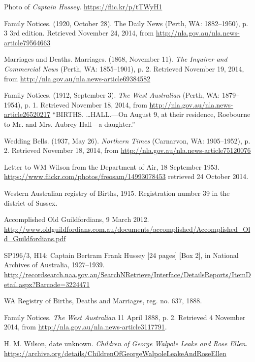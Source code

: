 \begin{thebibliography}{999}
	Photo of \emph{Captain Hussey}. \url{https://flic.kr/p/tTWyH1}

	Family Notices. (1920, October 28). The Daily News (Perth, WA: 1882--1950), p. 3 3rd edition.
	Retrieved November 24, 2014, from \url{http://nla.gov.au/nla.news-article79564663}

	Marriages and Deaths. Marriages. (1868, November 11). \emph{The Inquirer and Commercial News} (Perth, WA: 1855--1901), p. 2.
	Retrieved November 19, 2014, from \url{http://nla.gov.au/nla.news-article69384582}
    
	Family Notices. (1912, September 3). \emph{The West Australian} (Perth, WA: 1879--1954), p. 1.
	Retrieved November 18, 2014, from \url{http://nla.gov.au/nla.news-article26520217}
	``BIRTHS. \dots HALL.---On August 9, at their residence, Roebourne to Mr. and Mrs. Aubrey Hall---a daughter.''

	Wedding Bells. (1937, May 26). \emph{Northern Times} (Carnarvon, WA: 1905--1952), p. 2.
	Retrieved November 18, 2014, from \url{http://nla.gov.au/nla.news-article75120076}

	Letter to WM Wilson from the Department of Air, 18 September 1953.
	\url{https://www.flickr.com/photos/freosam/14993078453} retrieved 24 October 2014.

	Western Australian registry of Births, 1915. Registration number 39 in the district of Sussex.

	Accomplished Old Guildfordians, 9 March 2012.
	\url{http://www.oldguildfordians.com.au/documents/accomplished/Accomplished_Old_Guildfordians.pdf}

	SP196/3, H14: Captain Bertram Frank Hussey [24 pages] [Box 2], in National Archives of Australia, 1927--1939.
	\url{http://recordsearch.naa.gov.au/SearchNRetrieve/Interface/DetailsReports/ItemDetail.aspx?Barcode=3224471}

	WA Registry of Births, Deaths and Marriages, reg. no. 637, 1888.

	Family Notices. \emph{The West Australian} 11 April 1888, p. 2. Retrieved 4 November 2014,
	from \url{http://nla.gov.au/nla.news-article3117791}.

	H. M. Wilson, date unknown. \emph{Children of George Walpole Leake and Rose Ellen}.
	\url{https://archive.org/details/ChildrenOfGeorgeWalpoleLeakeAndRoseEllen}


\end{thebibliography}
